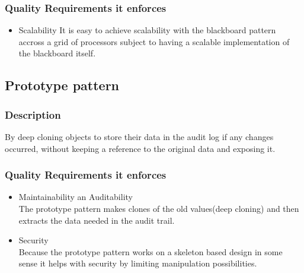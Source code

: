 		\subsubsection{Quality Requirements it enforces}
		\begin{itemize}
			\item Scalability
It is easy to achieve scalability with the blackboard pattern accross a grid of processors subject to having a scalable implementation of the blackboard itself.
		\end{itemize}	
		
	\subsection{Prototype pattern}
		\subsubsection{Description}
 			By deep cloning objects to store their data in the audit log if any changes occurred, without keeping a reference to the original data and exposing it.
		\subsubsection{Quality Requirements it enforces}
		\begin{itemize}
			\item Maintainability an Auditability\\
The prototype pattern makes clones of the old values(deep cloning) and then extracts the data needed in the audit trail.
			\item Security\\
Because the prototype pattern works on a skeleton based design in some sense it helps with security by limiting manipulation possibilities.

		\end{itemize}	